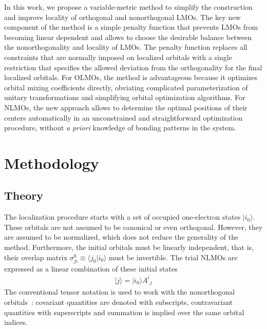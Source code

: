\documentclass[aps,prl,reprint,amsmath,amssymb]{revtex4-1}
\newcommand{\ket}[1]{\ensuremath{\vert #1 \rangle}}
\newcommand{\braket}[2]{\ensuremath{\langle #1 \vert #2 \rangle}} %
\begin{document}
In this work, we propose a variable-metric method to simplify the construction and improve locality of orthogonal and nonorthogonal LMOs. 
The key new component of the method is a simple penalty function that prevents LMOs from becoming linear dependent and allows to choose the desirable balance between the nonorthogonality and locality of LMOs. 
The penalty function replaces all constraints that are normally imposed on localized orbitals with a single restriction that specifies the allowed deviation from the orthogonality for the final localized orbitals. 
For \mbox{OLMOs}, the method is advantageous because it optimizes orbital mixing coefficients directly, obviating complicated parameterization of unitary transformations and simplifying orbital optimization algorithms.  
For \mbox{NLMOs}, the new approach allows to determine the optimal positions of their centers automatically in an unconstrained and straightforward optimization procedure, without \emph{a priori} knowledge of bonding patterns in the system.


\section{Methodology}

\subsection{Theory}

The localization procedure starts with a set of occupied one-electron states $\ket{i_0}$. 
These orbitals are not assumed to be canonical or even orthogonal. 
However, they are assumed to be normalized, which does not reduce the generality of the method. 
Furthermore, the initial orbitals must be linearly independent, that is, their overlap matrix $\sigma_{ji}^0 \equiv \braket{j_0}{i_0}$ must be invertible. 
The trial NLMOs are expressed as a linear combination of these initial states
%
\begin{equation}
\begin{split}
\ket{j} = \ket{i_0} {A^i}_j  
\end{split}
\end{equation}
%
The conventional tensor notation is used to work with the nonorthogonal orbitals~\cite{head1998tensor}: covariant quantities are denoted with subscripts, contravariant quantities with superscripts and summation is implied over the same orbital indices.
\end{document}
